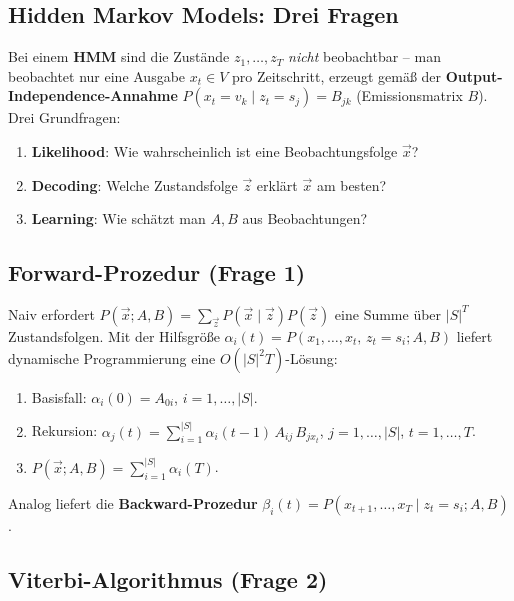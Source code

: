 \documentclass[11pt]{article}
\theoremstyle{csthm}
\theoremstyle{csdef}
\begin{document}
\subsection{Hidden Markov Models: Drei Fragen}

Bei einem \textbf{HMM} sind die Zustände $z_1,\ldots,z_T$ \emph{nicht}
beobachtbar -- man beobachtet nur eine Ausgabe $x_t\in V$ pro Zeitschritt,
erzeugt gemäß der \textbf{Output-Independence-Annahme}
$P(x_t{=}v_k\mid z_t{=}s_j) = B_{jk}$ (Emissionsmatrix $B$). Drei
Grundfragen:

\begin{enumerate}
  \item \textbf{Likelihood}: Wie wahrscheinlich ist eine Beobachtungsfolge $\vec x$?
  \item \textbf{Decoding}: Welche Zustandsfolge $\vec z$ erklärt $\vec x$ am besten?
  \item \textbf{Learning}: Wie schätzt man $A,B$ aus Beobachtungen?
\end{enumerate}

\subsection{Forward-Prozedur (Frage 1)}

Naiv erfordert $P(\vec x;A,B) = \sum_{\vec z} P(\vec x\mid\vec z)P(\vec z)$
eine Summe über $|S|^T$ Zustandsfolgen. Mit der Hilfsgröße
$\alpha_i(t) = P(x_1,\ldots,x_t,\,z_t{=}s_i;A,B)$ liefert dynamische
Programmierung eine $O(|S|^2 T)$-Lösung:

\begin{tcolorbox}[algostyle, title={Forward-Prozedur}]
\begin{enumerate}[leftmargin=*, itemsep=1pt]
  \item Basisfall: $\alpha_i(0) = A_{0i}$, $i=1,\ldots,|S|$.
  \item Rekursion: $\alpha_j(t) = \sum_{i=1}^{|S|} \alpha_i(t{-}1)\,A_{ij}\,B_{j x_t}$, $j=1,\ldots,|S|$, $t=1,\ldots,T$.
  \item $P(\vec x;A,B) = \sum_{i=1}^{|S|} \alpha_i(T)$.
\end{enumerate}
\end{tcolorbox}

Analog liefert die \textbf{Backward-Prozedur}
$\beta_i(t) = P(x_{t+1},\ldots,x_T \mid z_t{=}s_i;A,B)$.

\subsection{Viterbi-Algorithmus (Frage 2)}
\end{document}
